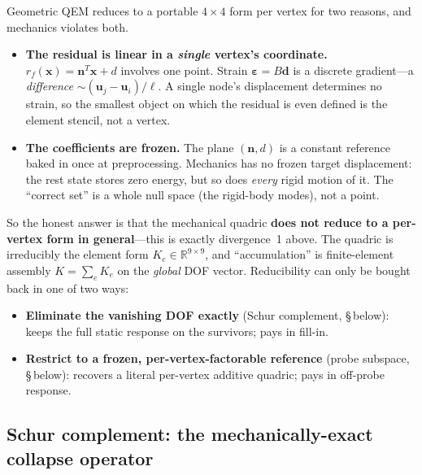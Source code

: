 Geometric QEM reduces to a portable $4\times4$ form per vertex for two reasons, and mechanics violates both.
\begin{itemize}
  \item \textbf{The residual is linear in a \emph{single} vertex's coordinate.}
        $r_f(\mathbf{x}) = \mathbf{n}^T\mathbf{x}+d$ involves one point.
        Strain $\boldsymbol\varepsilon = B\mathbf{d}$ is a discrete gradient---a \emph{difference} $\sim(\mathbf{u}_j-\mathbf{u}_i)/\ell$.
        A single node's displacement determines no strain, so the smallest object on which the residual is even defined is the element stencil, not a vertex.
  \item \textbf{The coefficients are frozen.}
        The plane $(\mathbf{n},d)$ is a constant reference baked in once at preprocessing.
        Mechanics has no frozen target displacement: the rest state stores zero energy, but so does \emph{every} rigid motion of it.
        The ``correct set'' is a whole null space (the rigid-body modes), not a point.
\end{itemize}
So the honest answer is that the mechanical quadric \textbf{does not reduce to a per-vertex form in general}---this is exactly divergence~1 above.
The quadric is irreducibly the element form $K_e\in\mathbb{R}^{9\times9}$, and ``accumulation'' is finite-element assembly $K=\sum_e K_e$ on the \emph{global} DOF vector.
Reducibility can only be bought back in one of two ways:
\begin{itemize}
  \item \textbf{Eliminate the vanishing DOF exactly} (Schur complement, \S\,below): keeps the full static response on the survivors; pays in fill-in.
  \item \textbf{Restrict to a frozen, per-vertex-factorable reference} (probe subspace, \S\,below): recovers a literal per-vertex additive quadric; pays in off-probe response.
\end{itemize}

\subsection{Schur complement: the mechanically-exact collapse operator}

